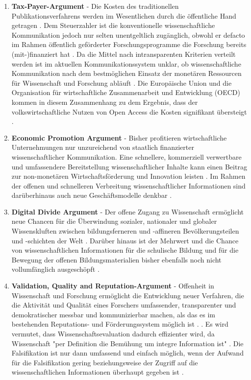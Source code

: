 \begin{enumerate}
\item \textbf{Tax-Payer-Argument} - Die Kosten des traditionellen Publikationsverfahrens werden im Wesentlichen durch die öffentliche Hand getragen \cite{muller_2010_open}. Dem Steuerzahler ist die konventionelle wissenschaftliche Kommunikation jedoch nur selten unentgeltlich zugänglich, obwohl er defacto im Rahmen öffentlich geförderter Forschungsprogramme die Forschung bereits (mit-)finanziert hat \cite{suber_2003_taxpayer} \cite{Baggs_2006} \cite{Beverungen_2012} \cite{Adema_2014_open_access}. Da die Mittel nach intransparenten Kriterien verteilt werden ist im aktuellen Kommunikationssystem unklar, ob wissenschaftliche Kommunikation nach dem bestmöglichen Einsatz der monetären Ressourcen für Wissenschaft und Forschung abläuft \cite{Glasziou_2014} \cite{altman_1994_scandal}. Die Europäische Union und die Organisation für wirtschaftliche Zusammenarbeit und Entwicklung (OECD) kommen in diesem Zusammenhang zu dem Ergebnis, dass der volkswirtschaftliche Nutzen von Open Access die Kosten signifikant übersteigt \cite{WD_bundestag_2009}.
\item \textbf{Economic Promotion Argument} - Bisher profitieren wirtschaftliche Unternehmungen nur unzureichend von staatlich finanzierter wissenschaftlicher Kommunikation. Eine schnellere, kommerziell verwertbare und umfassendere Bereitstellung wissenschaftlicher Inhalte kann einen Beitrag zur non-monetären Wirtschaftsförderung und Innovation leisten \cite{heise_2012} \cite{suchen OECD EU}. Im Rahmen der offenen und schnelleren Verbreitung wissenschaftlicher Informationen sind darüberhinaus auch neue Geschäftsmodelle denkbar \cite{suchen}.
\item \textbf{Digital Divide Argument} - Der offene Zugang zu Wissenschaft ermöglicht neue Chancen für die Überwindung sozialer, nationaler und globaler Wissenskluften \cite{suchen} zwischen bildungsferneren und -affineren Bevölkerungsteilen und -schichten der Welt \cite{boai_2012}. Darüber hinaus ist der Mehrwert und die Chance von wissenschaftlichen Informationen für die schulische Bildung und für die Bewegung der offenen Bildungsmaterialien bisher ebenfalls noch nicht vollumfänglich ausgeschöpft \cite{heise_lernen_2013}.
\item \textbf{Validation, Quality and Reputation-Argument} - Offenheit in Wissenschaft und Forschung ermöglicht die Entwicklung neuer Verfahren, die die Aktivität und Qualität eines Forschers umfassender, transparenter und demokratischer messbar und kommunizierbar machen, als das es im bestehenden Reputations- und Förderungssystem möglich ist \cite{grand_2012_open}. \cite{chalmers_2009_avoidable_waste}. Es wird vermutet, dass Wissenschaftsevaluation dadurch effizienter wird, da Wissenschaft "per Definition die Bemühung um integre Information ist" \cite{umstatter_2007_qualitatssicherung}. Die Falsifikation ist nur dann umfassend und einfach möglich, wenn der Aufwand für die Falsifikation gering beziehungsweise der Zugriff auf die wissenschaftlichen Informationen überhaupt gegeben ist \cite{umstatter_2007_qualitatssicherung}.

\end{enumerate}

